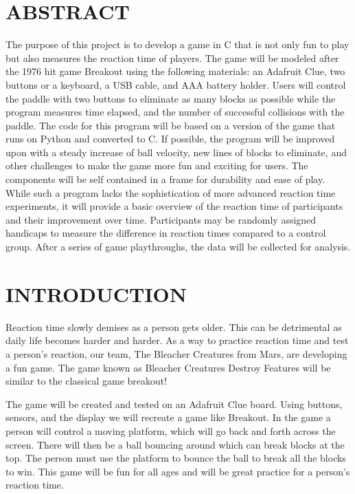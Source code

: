 \documentclass[12pt]{article}
\begin{document}
\tableofcontents
\pagebreak

\section{ABSTRACT}

The purpose of this project is to develop a game in C that is not only fun to play but also measures the reaction time of players. The game will be modeled after the 
1976 hit game Breakout using the following materials: an Adafruit Clue, two buttons or a keyboard, a USB cable, and AAA battery holder. Users will control the paddle 
with two buttons to eliminate as many blocks as possible while the program measures time elapsed, and the number of successful collisions with the paddle. The code 
for this program will be based on a version of the game that runs on Python and converted to C. If possible, the program will be improved upon with a steady increase 
of ball velocity, new lines of blocks to eliminate, and other challenges to make the game more fun and exciting for users. The components will be self contained in a 
frame for durability and ease of play. While such a program lacks the sophistication of more advanced reaction time experiments, it will provide a basic overview of 
the reaction time of participants and their improvement over time. Participants may be randomly assigned handicaps to measure the difference in reaction times compared 
to a control group. After a series of game playthroughs, the data will be collected for analysis. 

\section{INTRODUCTION}
Reaction time slowly demises as a person gets older. This can be detrimental as daily life becomes harder and harder. As a way to practice reaction time and test a person's reaction, our team, The Bleacher Creatures from Mars, are developing a fun game. The game known as Bleacher Creatures Destroy Features will be similar to the classical game breakout!

The game will be created and tested on an Adafruit Clue board. Using buttons, sensors, and the display we will recreate a game like Breakout. In the game a person will control a moving platform, which will go back and forth across the screen. There will then be a ball bouncing around which can break blocks at the top. The person must use the platform to bounce the ball to break all the blocks to win. This game will be fun for all ages and will be great practice for a person's reaction time.
\end{document}
